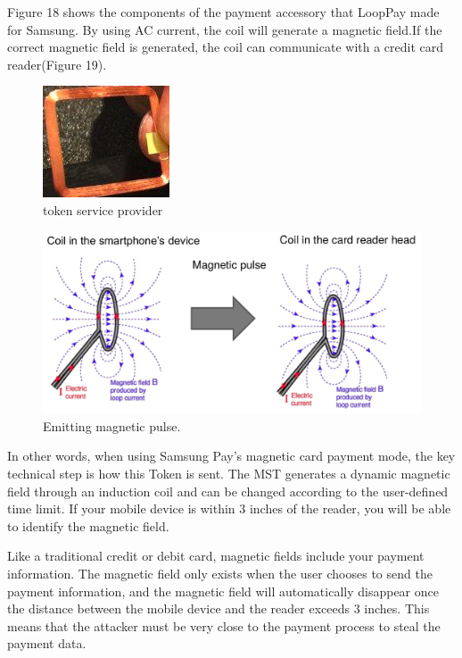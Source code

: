 \documentclass[journal]{IEEEtran}
\begin{document}
Figure 18 shows the components of the payment accessory that LoopPay made for Samsung. By using AC current, the coil will generate a magnetic field.If the correct magnetic field is generated, the coil can communicate with a credit card reader(Figure 19).

\begin{figure}[htbp]
\centerline{\includegraphics[scale=1]{MSTyuanjian2.png}}
\caption{token service provider}
\label{fig}
\end{figure}


\begin{figure}[htbp]
\centerline{\includegraphics[scale=0.18]{Emittingmagneticpulse.png}}
\caption{Emitting magnetic pulse.}
\label{fig}
\end{figure}



In other words, when using Samsung Pay's magnetic card payment mode, the key technical step is how this Token is sent. The MST generates a dynamic magnetic field through an induction coil and can be changed according to the user-defined time limit. If your mobile device is within 3 inches of the reader, you will be able to identify the magnetic field.

Like a traditional credit or debit card, magnetic fields include your payment information. The magnetic field only exists when the user chooses to send the payment information, and the magnetic field will automatically disappear once the distance between the mobile device and the reader exceeds 3 inches. This means that the attacker must be very close to the payment process to steal the payment data.
\end{document}
